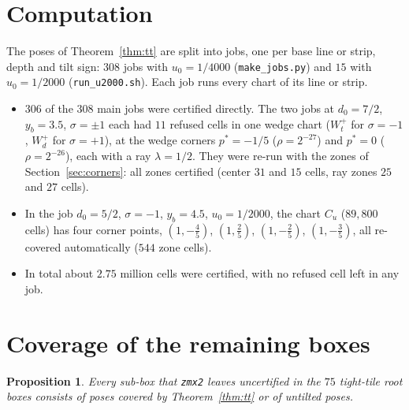 \documentclass[11pt]{amsart}
\newtheorem{proposition}[theorem]{Proposition}
\theoremstyle{definition}
\theoremstyle{remark}
\begin{document}
\section{Computation}\label{sec:computation}

The poses of Theorem~\ref{thm:tt} are split into jobs, one per base line or strip, depth and tilt sign: $308$ jobs
with $u_0=1/4000$ (\texttt{make\_jobs.py}) and $15$ with $u_0=1/2000$ (\texttt{run\_u2000.sh}). Each job runs every chart
of its line or strip.
\begin{itemize}
\item $306$ of the $308$ main jobs were certified directly. The two jobs at $d_0=7/2$, $y_b=3.5$, $\sigma=\pm1$ each had
$11$ refused cells in one wedge chart ($W_t^+$ for $\sigma=-1$, $W_d^+$ for $\sigma=+1$), at the wedge corners
$p^*=-1/5$ ($\rho=2^{-27}$) and $p^*=0$ ($\rho=2^{-26}$), each with a ray $\lambda=1/2$. They were re-run with the zones
of Section~\ref{sec:corners}: all zones certified (center $31$ and $15$ cells, ray zones $25$ and $27$ cells).
\item In the job $d_0=5/2$, $\sigma=-1$, $y_b=4.5$, $u_0=1/2000$, the chart $C_u$ ($89{,}800$ cells) has four corner
points, $(1,-\frac45)$, $(1,\frac25)$, $(1,-\frac25)$, $(1,-\frac35)$, all re-covered automatically ($544$ zone cells).
\item In total about $2.75$ million cells were certified, with no refused cell left in any job.
\end{itemize}

\section{Coverage of the remaining boxes}\label{sec:coverage}

\begin{proposition}\label{prop:coverage}
Every sub-box that \texttt{zmx2} leaves uncertified in the $75$ tight-tile root boxes consists of poses covered by
Theorem~\ref{thm:tt} or of untilted poses.
\end{proposition}
\end{document}

